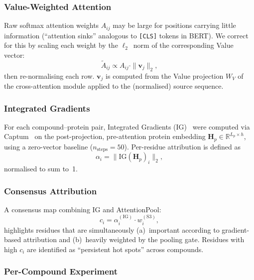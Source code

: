 \documentclass[11pt,twocolumn]{article}
\begin{document}
\subsubsection{Value-Weighted Attention}

Raw softmax attention weights $A_{ij}$ may be large for positions carrying
little information (``attention sinks'' analogous to \texttt{[CLS]} tokens in
BERT).  We correct for this by scaling each weight by the $\ell_2$~norm of
the corresponding Value vector:
\begin{equation}
  \tilde{A}_{ij} \propto A_{ij} \cdot \|\mathbf{v}_j\|_2,
\end{equation}
then re-normalising each row.  $\mathbf{v}_j$ is computed from the Value
projection $W_V$ of the cross-attention module applied to the (normalised)
source sequence.

\subsubsection{Integrated Gradients}

For each compound--protein pair, Integrated Gradients
(IG)~\cite{sundararajan2017ig} were computed via
Captum~\cite{kokhlikyan2020captum} on the post-projection, pre-attention
protein embedding $\mathbf{H}_p \in \mathbb{R}^{L_p \times h}$, using a
zero-vector baseline ($n_\text{steps}=50$).  Per-residue attribution is
defined as
\begin{equation}
  \alpha_i = \|\text{IG}(\mathbf{H}_p)_i\|_2,
\end{equation}
normalised to sum to~1.

\subsubsection{Consensus Attribution}

A consensus map combining IG and AttentionPool:
\begin{equation}
  c_i = \alpha_i^{(\text{IG})} \cdot w_i^{(\text{S3})},
\end{equation}
highlights residues that are simultaneously (a)~important according to
gradient-based attribution and (b)~heavily weighted by the pooling gate.
Residues with high $c_i$ are identified as ``persistent hot spots'' across
compounds.

\subsubsection{Per-Compound Experiment}
\end{document}
